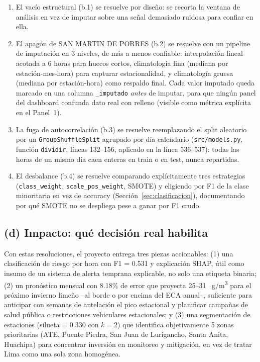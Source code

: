 \documentclass[11pt,a4paper]{article}
\begin{document}
\begin{enumerate}[leftmargin=1.5em]

\item El vacío estructural (b.1) se resuelve por diseño: se recorta la ventana de
análisis en vez de imputar sobre una señal demasiado ruidosa para confiar en ella.

\item El apagón de SAN MARTIN DE PORRES (b.2) se resuelve con un pipeline de
imputación en 3 niveles, de más a menos confiable: interpolación lineal acotada a 6
horas para huecos cortos, climatología fina (mediana por estación-mes-hora) para
capturar estacionalidad, y climatología gruesa (mediana por estación-hora) como
respaldo final. Cada valor imputado queda marcado en una columna \texttt{\_imputado}
\emph{antes} de imputar, para que ningún panel del dashboard confunda dato real con
relleno (visible como métrica explícita en el Panel~1).

\item La fuga de autocorrelación (b.3) se resuelve reemplazando el split aleatorio por
un \texttt{Group\-Shuffle\-Split} agrupado por día calendario
(\texttt{src/\allowbreak models.py}, función \texttt{dividir}, líneas 132--156, aplicado en la
línea 536--537): todas las horas de un mismo día caen enteras en train o en test, nunca
repartidas.

\item El desbalance (b.4) se resuelve comparando explícitamente tres estrategias
(\texttt{class\_\allowbreak weight}, \texttt{scale\_\allowbreak pos\_\allowbreak weight}, SMOTE) y eligiendo por F1 de la
clase minoritaria en vez de accuracy (Sección~\ref{sec:clasificacion}), documentando
por qué SMOTE no se despliega pese a ganar por F1 crudo.

\end{enumerate}

\subsection*{(d) Impacto: qué decisión real habilita}

Con estas resoluciones, el proyecto entrega tres piezas accionables: (1) una
clasificación de riesgo por hora con F1 = 0.531 y explicación SHAP, útil como insumo de
un sistema de alerta temprana explicable, no solo una etiqueta binaria; (2) un
pronóstico mensual con 8.18\% de error que proyecta 25--31~\textmu
g/m\textsuperscript{3} para el próximo invierno limeño --al borde o por encima del ECA
anual--, suficiente para anticipar con semanas de antelación el pico estacional y
planificar campañas de salud pública o restricciones vehiculares estacionales; y (3)
una segmentación de estaciones
(silueta = 0.330 con $k=2$) que identifica objetivamente 5 zonas prioritarias (ATE,
Puente Piedra, San Juan de Lurigancho, Santa Anita, Huachipa) para concentrar inversión
en monitoreo y mitigación, en vez de tratar Lima como una sola zona homogénea.
\end{document}
